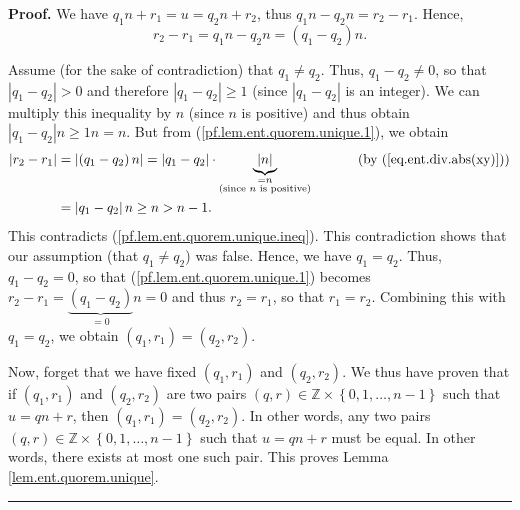 \documentclass[numbers=enddot,12pt,final,onecolumn,notitlepage]{scrartcl}%
\numberwithin{exer}{subsection}
\theoremstyle{definition}
\newenvironment{proof}[1][Proof]{\noindent\textbf{#1.} }{\ \rule{0.5em}{0.5em}}
\begin{document}
\begin{proof}
We have $q_{1}n+r_{1}=u=q_{2}n+r_{2}$, thus $q_{1}n-q_{2}n=r_{2}-r_{1}$.
Hence,%
\begin{equation}
r_{2}-r_{1}=q_{1}n-q_{2}n=\left(  q_{1}-q_{2}\right)  n.
\label{pf.lem.ent.quorem.unique.1}%
\end{equation}


Assume (for the sake of contradiction) that $q_{1}\neq q_{2}$. Thus,
$q_{1}-q_{2}\neq0$, so that $\left\vert q_{1}-q_{2}\right\vert >0$ and
therefore $\left\vert q_{1}-q_{2}\right\vert \geq1$ (since $\left\vert
q_{1}-q_{2}\right\vert $ is an integer). We can multiply this inequality by
$n$ (since $n$ is positive) and thus obtain $\left\vert q_{1}-q_{2}\right\vert
n\geq1n=n$. But from (\ref{pf.lem.ent.quorem.unique.1}), we obtain%
\begin{align*}
\left\vert r_{2}-r_{1}\right\vert  &  =\left\vert \left(  q_{1}-q_{2}\right)
n\right\vert =\left\vert q_{1}-q_{2}\right\vert \cdot\underbrace{\left\vert
n\right\vert }_{\substack{=n\\\text{(since }n\text{ is positive)}%
}}\ \ \ \ \ \ \ \ \ \ \left(  \text{by (\ref{eq.ent.div.abs(xy)})}\right) \\
&  =\left\vert q_{1}-q_{2}\right\vert n\geq n>n-1.
\end{align*}
This contradicts (\ref{pf.lem.ent.quorem.unique.ineq}). This contradiction
shows that our assumption (that $q_{1}\neq q_{2}$) was false. Hence, we have
$q_{1}=q_{2}$. Thus, $q_{1}-q_{2}=0$, so that
(\ref{pf.lem.ent.quorem.unique.1}) becomes $r_{2}-r_{1}=\underbrace{\left(
q_{1}-q_{2}\right)  }_{=0}n=0$ and thus $r_{2}=r_{1}$, so that $r_{1}=r_{2}$.
Combining this with $q_{1}=q_{2}$, we obtain $\left(  q_{1},r_{1}\right)
=\left(  q_{2},r_{2}\right)  $.

Now, forget that we have fixed $\left(  q_{1},r_{1}\right)  $ and $\left(
q_{2},r_{2}\right)  $. We thus have proven that if $\left(  q_{1}%
,r_{1}\right)  $ and $\left(  q_{2},r_{2}\right)  $ are two pairs $\left(
q,r\right)  \in\mathbb{Z}\times\left\{  0,1,\ldots,n-1\right\}  $ such that
$u=qn+r$, then $\left(  q_{1},r_{1}\right)  =\left(  q_{2},r_{2}\right)  $. In
other words, any two pairs $\left(  q,r\right)  \in\mathbb{Z}\times\left\{
0,1,\ldots,n-1\right\}  $ such that $u=qn+r$ must be equal. In other words,
there exists at most one such pair. This proves Lemma
\ref{lem.ent.quorem.unique}.
\end{proof}
\end{document}
